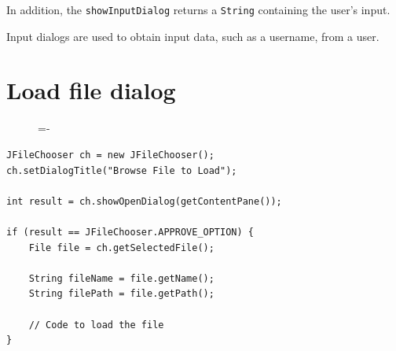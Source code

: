\documentclass[a4paper]{systems-software}
\begin{document}
In addition, the \texttt{showInputDialog} returns a \texttt{String} containing the user's input.

Input dialogs are used to obtain input data, such as a username, from a user.


\section*{Load file dialog}

\begin{figure}[H]
	\lineskip=-\fboxrule
\end{figure}

\begin{lstlisting}[title={Creating a load file dialog.}]
JFileChooser ch = new JFileChooser();
ch.setDialogTitle("Browse File to Load");

int result = ch.showOpenDialog(getContentPane());

if (result == JFileChooser.APPROVE_OPTION) {
	File file = ch.getSelectedFile();
	
	String fileName = file.getName();
	String filePath = file.getPath();
	
	// Code to load the file
}
\end{lstlisting}
\end{document}
